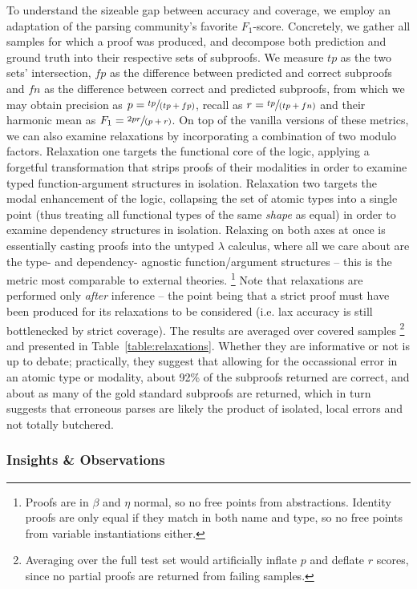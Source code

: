 To understand the sizeable gap between accuracy and coverage, we employ an adaptation of the parsing community's favorite $F_1$-score.
Concretely, we gather all samples for which a proof was produced, and decompose both prediction and ground truth into their respective sets of subproofs.
We measure $tp$ as the two sets' intersection, $fp$ as the difference between predicted and correct subproofs and $fn$ as the difference between correct and predicted subproofs, from which we may obtain precision as $p = \sfrac{tp}{(tp+fp)}$, recall as $r = \sfrac{tp}{(tp+fn)}$ and their harmonic mean as $F_1 = \sfrac{2 p r}{(p + r)}$.
On top of the vanilla versions of these metrics, we can also examine relaxations by incorporating a combination of two modulo factors.
Relaxation one targets the functional core of the logic, applying a forgetful transformation that strips proofs of their modalities in order to examine typed function-argument structures in isolation.
Relaxation two targets the modal enhancement of the logic, collapsing the set of atomic types into a single point (thus treating all functional types of the same \textit{shape} as equal) in order to examine dependency structures in isolation.
Relaxing on both axes at once is essentially casting proofs into the untyped $\lambda$ calculus, where all we care about are the type- and dependency- agnostic function/argument structures -- this is the metric most comparable to external theories.%
	\footnote{Proofs are in $\beta$ and $\eta$ normal, so no free points from abstractions. Identity proofs are only equal if they match in both name and type, so no free points from variable instantiations either.}
Note that relaxations are performed only \textit{after} inference -- the point being that a strict proof must have been produced for its relaxations to be considered (i.e. lax accuracy is still bottlenecked by strict coverage).
The results are averaged over covered samples%
	\footnote{Averaging over the full test set would artificially inflate $p$ and deflate $r$ scores, since no partial proofs are returned from failing samples.}
and presented in Table~\ref{table:relaxations}.
Whether they are informative or not is up to debate; practically, they suggest that allowing for the occassional error in an atomic type or modality, about 92\% of the subproofs returned are correct, and about as many of the gold standard subproofs are returned, which in turn suggests that erroneous parses are likely the product of isolated, local errors and not totally butchered.

\subsubsection{Insights \& Observations}
